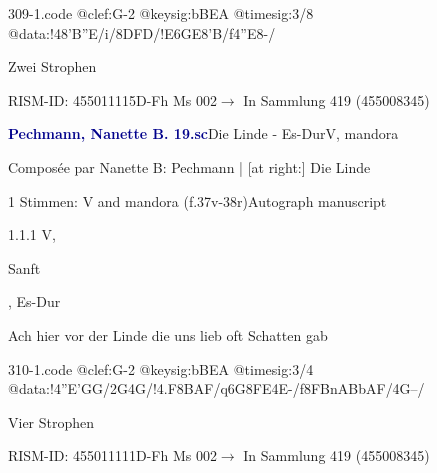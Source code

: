 \documentclass[twocolumn, 12pt]{book}
\begin{document}
\begin{filecontents*}{309-1.code}
@clef:G-2
@keysig:bBEA
@timesig:3/8
@data:!48'B''E/i/{8DFD}/!E{6GE}8'B/f4''E8-/
\end{filecontents*}
\newline %
\par Zwei Strophen
\par RISM-ID: 455011115\newline D-Fh  Ms 002\newline $\rightarrow$ In Sammlung 419 (455008345)
      
\par \vspace{16pt} \textcolor{darkblue}{\textbf{Pechmann, Nanette B.  19.sc}}\hfillplus{\textbf{[310]}}\newline Die Linde - Es-Dur\newline V, mandora
\par \begin{itshape}[heading, f.37v:] Composée par Nanette B: Pechmann | [at right:] Die Linde\end{itshape} 
\par \textcolor{darkblue}{}  1 Stimmen: V and mandora  (f.37v-38r)\newline Autograph manuscript
\par 1.1.1  V, \begin{itshape}Sanft\end{itshape}, Es-Dur\newline \begin{footnotesize} Ach hier vor der Linde die uns lieb oft Schatten gab \end{footnotesize}  
\begin{filecontents*}{310-1.code}
@clef:G-2
@keysig:bBEA
@timesig:3/4
@data:!4''E'GG/2G4G/!4.F8BAF/q6G{8FE}4E-/f{8FBnABbAF}/4G--/
\end{filecontents*}
\newline %
\par Vier Strophen
\par RISM-ID: 455011111\newline D-Fh  Ms 002\newline $\rightarrow$ In Sammlung 419 (455008345)
      
\end{document}
